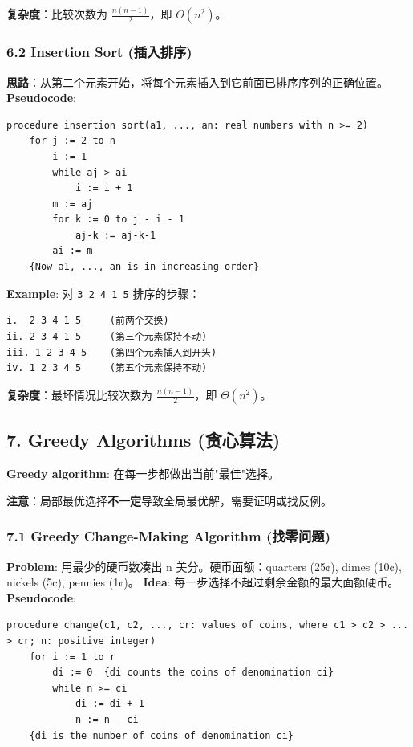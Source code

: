 \documentclass[10pt,a4paper,openany]{ctexbook}
\theoremstyle{definition}
\theoremstyle{remark}
\renewenvironment{quote}
  {\list{}{\leftmargin=1em\rightmargin=0pt\topsep=0.5pt\partopsep=0pt}\item[]}
  {\endlist}
\begin{document}
\textbf{复杂度}：比较次数为 $\frac{n(n-1)}{2}$，即 $\Theta(n^2)$。
\subsubsection{6.2 Insertion Sort (插入排序)}

\textbf{思路}：从第二个元素开始，将每个元素插入到它前面已排序序列的正确位置。
\textbf{Pseudocode}:
{\footnotesize\begin{verbatim}
procedure insertion sort(a1, ..., an: real numbers with n >= 2)
    for j := 2 to n
        i := 1
        while aj > ai
            i := i + 1
        m := aj
        for k := 0 to j - i - 1
            aj-k := aj-k-1
        ai := m
    {Now a1, ..., an is in increasing order}
\end{verbatim}}

\textbf{Example}: 对 \texttt{3 2 4 1 5} 排序的步骤：
{\footnotesize\begin{verbatim}
i.  2 3 4 1 5     (前两个交换)
ii. 2 3 4 1 5     (第三个元素保持不动)
iii. 1 2 3 4 5    (第四个元素插入到开头)
iv. 1 2 3 4 5     (第五个元素保持不动)
\end{verbatim}}

\textbf{复杂度}：最坏情况比较次数为 $\frac{n(n-1)}{2}$，即 $\Theta(n^2)$。
\vspace{-2pt}

\subsection{7. Greedy Algorithms (贪心算法)}

\begin{quote}
\textbf{Greedy algorithm}: 在每一步都做出当前"最佳"选择。

\textbf{注意}：局部最优选择\textbf{不一定}导致全局最优解，需要证明或找反例。

\end{quote}

\subsubsection{7.1 Greedy Change-Making Algorithm (找零问题)}

\textbf{Problem}: 用最少的硬币数凑出 n 美分。硬币面额：quarters (25¢), dimes (10¢), nickels (5¢), pennies (1¢)。
\textbf{Idea}: 每一步选择不超过剩余金额的最大面额硬币。
\textbf{Pseudocode}:
{\footnotesize\begin{verbatim}
procedure change(c1, c2, ..., cr: values of coins, where c1 > c2 > ... > cr; n: positive integer)
    for i := 1 to r
        di := 0  {di counts the coins of denomination ci}
        while n >= ci
            di := di + 1
            n := n - ci
    {di is the number of coins of denomination ci}
\end{verbatim}}
\end{document}
